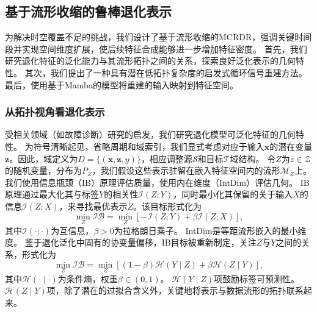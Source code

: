\documentclass[UTF8,lettersize,journal]{IEEEtran}
\begin{document}
\subsection{基于流形收缩的鲁棒退化表示}

为解决时空覆盖不足的挑战，我们设计了基于流形收缩的MCRDR，强调关键时间段并实现空间维度扩展，使后续特征合成能够进一步增加特征密度。
首先，我们研究退化特征的泛化能力与其流形拓扑之间的关系，探索良好泛化表示的几何特性。
其次，我们提出了一种具有潜在低拓扑复杂度的启发式循环信号重建方法。
最后，使用基于Mamba的模型将重建的输入映射到特征空间。

\subsubsection{从拓扑视角看退化表示}

受相关领域（如故障诊断）研究的启发，我们研究退化模型可泛化特征的几何特性。
为符号清晰起见，省略周期和域索引，我们显式考虑对应于输入$\boldsymbol{x}$的潜在变量$\boldsymbol{z}$。因此，域定义为$D = \{ (\boldsymbol{x}, \boldsymbol{z}, y) \}$，相应调整源$\mathcal{S}$和目标$\mathcal{T}$域结构。
令$Z$为$z \in \mathcal{Z}$的随机变量，分布为$P_{Z}$，我们假设这些表示驻留在嵌入特征空间内的流形$\mathcal{M}_{Z}$上。
我们使用信息瓶颈（IB）\cite{alemi2017deep}原理评估质量，使用内在维度（IntDim）\cite{10.5555/3692070.3694510}评估几何。
IB原理通过最大化其与标签$Y$的相关性$\mathcal{I}(Z;Y)$，同时最小化其保留的关于输入$X$的信息$\mathcal{I}(Z;X)$，来寻找最优表示$Z$。该目标形式化为
\begin{equation}
    \min_{Z} \mathcal{IB} = \min_{Z} [- \mathcal{I}(Z;Y) + \beta \mathcal{I}(Z;X)], 
    \label{IB_mutual_info}
\end{equation}
其中$\mathcal{I}(\cdot;\cdot)$为互信息，$\beta > 0$为拉格朗日乘子。
IntDim是等距流形嵌入的最小维度。
鉴于退化泛化中固有的协变量偏移，IB目标被重新制定，关注$Z$与$Y$之间的关系，形式化为
\begin{equation}
    \min_{Z} \mathcal{IB} = \min_{Z} [(1-\beta) \mathcal{H}(Y \mid Z) + \beta \mathcal{H}(Z \mid Y)], 
    \label{IB_cond_entropy}
\end{equation}
其中$\mathcal{H}(\cdot \mid \cdot)$为条件熵，权重$\beta \in (0, 1)$。
$\mathcal{H}(Y \mid Z)$项鼓励标签可预测性。
$\mathcal{H}(Z \mid Y)$项，除了潜在的过拟合含义外，关键地将表示与数据流形的拓扑联系起来。
\end{document}
